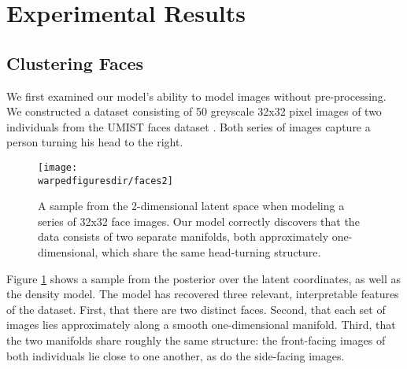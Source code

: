 



\section{Experimental Results}

\subsection{Clustering Faces}

We first examined our model's ability to model images without pre-processing.
We constructed a dataset consisting of 50 greyscale 32x32 pixel images of two individuals from the UMIST faces dataset \citep{umistfaces}.
Both series of images capture a person turning his head to the right.

\begin{figure}[ht!]
\centering
\texttt{[image: \\warpedfiguresdir/faces2]}
\caption[Latent clusters of face images]{A sample from the 2-dimensional latent space when modeling a series of 32x32 face images.
Our model correctly discovers that the data consists of two separate manifolds, both approximately one-dimensional, which share the same head-turning structure.}
\label{fig:faces}
\end{figure}

Figure \ref{fig:faces} shows a sample from the posterior over the latent coordinates, as well as the density model.  The model has recovered three relevant, interpretable features of the dataset.
First, that there are two distinct faces.
Second, that each set of images lies approximately along a smooth one-dimensional manifold.
Third, that the two manifolds share roughly the same structure: the front-facing images of both individuals lie close to one another, as do the side-facing images.


